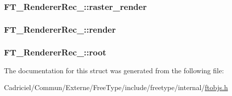 \hypertarget{struct_f_t___renderer_rec___a6dc07268fc39d9dde130a5708607d19d}{
\subsubsection[{raster\-\_\-render}]{ F\-T\-\_\-\-Renderer\-Rec\-\_\-\-::raster\-\_\-render}}\label{struct_f_t___renderer_rec___a6dc07268fc39d9dde130a5708607d19d}
\hypertarget{struct_f_t___renderer_rec___a197bfeb9dde4aef8eee87bc3ea95312e}{
\subsubsection[{render}]{ F\-T\-\_\-\-Renderer\-Rec\-\_\-\-::render}}\label{struct_f_t___renderer_rec___a197bfeb9dde4aef8eee87bc3ea95312e}
\hypertarget{struct_f_t___renderer_rec___a7c93326898f03a9eb224f57104fa2433}{
\subsubsection[{root}]{ F\-T\-\_\-\-Renderer\-Rec\-\_\-\-::root}}\label{struct_f_t___renderer_rec___a7c93326898f03a9eb224f57104fa2433}


The documentation for this struct was generated from the following file\-:\begin{DoxyCompactItemize}
\item 
Cadriciel/\-Commun/\-Externe/\-Free\-Type/include/freetype/internal/\hyperlink{ftobjs_8h}{ftobjs.\-h}\end{DoxyCompactItemize}
